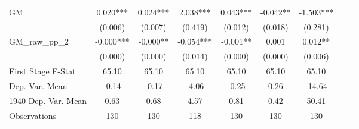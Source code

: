 \begin{tabular}{l*{8}{c}}
GM              &    0.020***&    0.024***&    2.038***&    0.043***&   -0.042** &   -1.503***\\
                &  (0.006)   &  (0.007)   &  (0.419)   &  (0.012)   &  (0.018)   &  (0.281)   \\
\addlinespace
GM\_raw\_pp\_2     &   -0.000***&   -0.000** &   -0.054***&   -0.001** &    0.001   &    0.012** \\
                &  (0.000)   &  (0.000)   &  (0.014)   &  (0.000)   &  (0.000)   &  (0.006)   \\
\midrule
First Stage F-Stat&    65.10   &    65.10   &    65.10   &    65.10   &    65.10   &    65.10   \\
Dep. Var. Mean  &    -0.14   &    -0.17   &    -4.06   &    -0.25   &     0.26   &   -14.64   \\
1940 Dep. Var. Mean&     0.63   &     0.68   &     4.57   &     0.81   &     0.42   &    50.41   \\
Observations    &      130   &      130   &      118   &      130   &      130   &      130   \\
       \bottomrule \end{tabular}
